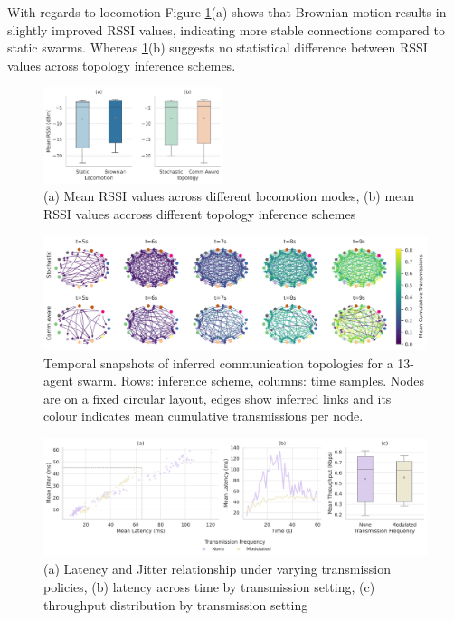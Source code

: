 \documentclass[conference]{IEEEtran}
\begin{document}
With regards to locomotion Figure \ref{fig:rssi}(a) shows that Brownian motion results in slightly improved RSSI values, indicating more stable connections compared to static swarms. Whereas \ref{fig:rssi}(b) suggests no statistical difference between RSSI values across topology inference schemes.

\begin{figure}[H]
    \centering
    \includegraphics[width=0.47\textwidth]{speed_impact.pdf}
    \caption{(a) Mean RSSI values across different locomotion modes, (b) mean RSSI values accross different topology inference schemes}
    \label{fig:rssi}
\end{figure}

\begin{figure}[h]
    \centering
    \includegraphics[width=1\textwidth]{convergence_impact.pdf}
    \caption{Temporal snapshots of inferred communication topologies for a 13-agent swarm. Rows: inference scheme, columns: time samples. Nodes are on a fixed circular layout, edges show inferred links and its colour indicates mean cumulative transmissions per node.}
    \label{fig:convergence}
\end{figure}

\begin{figure}[h]
    \centering
    \includegraphics[width=1\textwidth]{frequency_impact.pdf}
    \caption{(a) Latency and Jitter relationship under varying transmission policies, (b) latency across time by transmission setting, (c) throughput distribution by transmission setting}
    \label{fig:frequency}
\end{figure}
\end{document}
